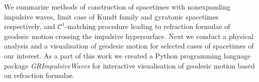 \documentclass[12pt]{report}
\begin{document}

We summarize methods of construction of spacetimes with nonexpanding impulsive waves,
limit case of Kundt family and gyratonic spacetimes respectively, and $\mathcal{C}^1$-matching procedure
leading to refraction formulae of geodesic motion crossing the impulsive hypersurface.
Next we conduct a physical analysis and a visualisation of geodesic motion for selected cases of spacetimes of our interest.
As a part of this work we created a Python programming language package \emph{GRImpulsiveWaves} for
interactive visualisation of geodesic motion based on refraction formulae.
\end{document}
